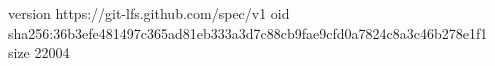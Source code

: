 version https://git-lfs.github.com/spec/v1
oid sha256:36b3efe481497c365ad81eb333a3d7c88cb9fae9cfd0a7824c8a3c46b278e1f1
size 22004
